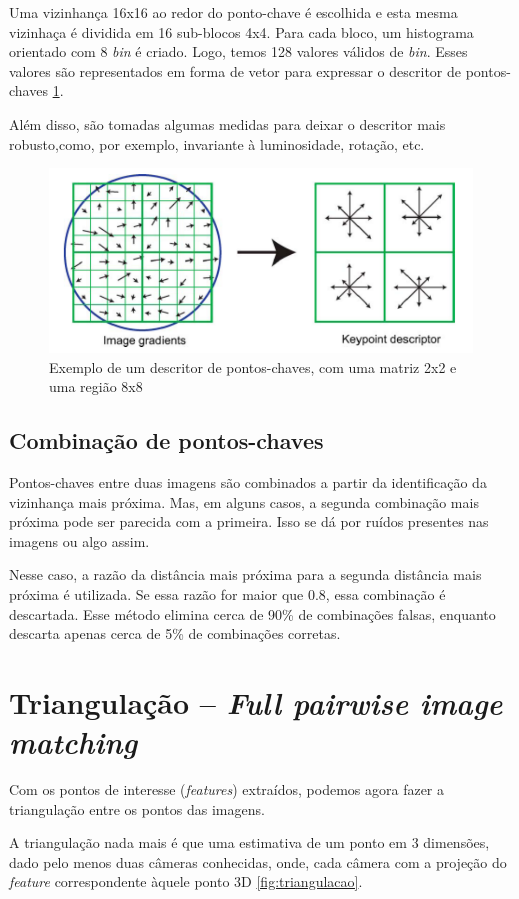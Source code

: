 Uma vizinhança 16x16 ao redor do ponto-chave é escolhida e esta mesma vizinhaça é dividida em 16 sub-blocos 4x4. Para cada bloco, um histograma orientado com 8 {\it bin} é criado. Logo, temos 128 valores válidos de {\it bin}. Esses valores são representados em forma de vetor para expressar o descritor de pontos-chaves \ref{fig:descritorKeypoint}. 

Além disso, são tomadas algumas medidas para deixar o descritor mais robusto,como, por exemplo, invariante à luminosidade, rotação, etc.

\begin{figure} [!h]
	\centering
	\includegraphics[width=0.45\linewidth]{figs/descritorKeypoint.png}
	\caption{%
	Exemplo de um descritor de pontos-chaves, com uma matriz 2x2 e uma região 8x8
	}\label{fig:descritorKeypoint}
\end{figure}

\subsection{Combinação de pontos-chaves}

Pontos-chaves entre duas imagens são combinados a partir da identificação da vizinhança mais próxima. Mas, em alguns casos, a segunda combinação mais próxima pode ser parecida com a primeira. Isso se dá por ruídos presentes nas imagens ou algo assim. 

Nesse caso, a razão da distância mais próxima para a segunda distância mais próxima é utilizada. Se essa razão for maior que 0.8, essa combinação é descartada.
Esse método elimina cerca de 90\% de combinações falsas, enquanto descarta apenas cerca de 5\% de combinações corretas.

\section {Triangulação -- {\it Full pairwise image matching}}

Com os pontos de interesse ({\it features}) extraídos, podemos agora fazer a triangulação entre os pontos das imagens.

A triangulação nada mais é que uma estimativa de um ponto em 3 dimensões, dado pelo menos duas câmeras conhecidas, onde, cada câmera com a projeção do {\it feature} correspondente àquele ponto 3D \ref{fig:triangulacao}.

